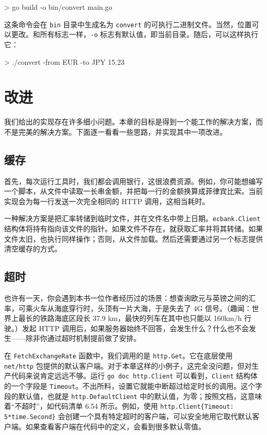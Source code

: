 \begin{shellcode}[]
> go build -o bin/convert main.go
\end{shellcode}

这条命令会在 \texttt{bin} 目录中生成名为 \texttt{convert} 的可执行二进制文件。当然，位置可以更改。和所有标志一样，\texttt{-o} 标志有默认值，即当前目录。随后，可以这样执行它：

\begin{shellcode}[]
> ./convert -from EUR -to JPY 15.23
\end{shellcode}

\section{改进}

我们给出的实现存在许多细小问题。本章的目标是得到一个能工作的解决方案，而不是完美的解决方案。下面逐一看看一些思路，并实现其中一项改进。

\subsection{缓存}

首先，每次运行工具时，我们都会调用银行，这很浪费资源。例如，你可能想编写一个脚本，从文件中读取一长串金额，并把每一行的金额换算成菲律宾比索。当前实现会为每一行发送一次完全相同的 HTTP 调用，这相当耗时。

一种解决方案是把汇率转储到临时文件，并在文件名中带上日期。\texttt{ecbank.Client} 结构体将持有指向该文件的指针。如果文件不存在，就获取汇率并将其转储。如果文件太旧，也执行同样操作；否则，从文件加载。然后还需要通过另一个标志提供清空缓存的方式。

\subsection{超时}

也许有一天，你会遇到本书一位作者经历过的场景：想查询欧元与英镑之间的汇率，可乘火车从海底穿行时，头顶有一片大海，于是失去了 4G 信号。（趣闻：世界上最长的铁路海底区段长 37.9 km，最快的列车在其中也只能以 160km/h 行驶。）发起 HTTP 调用后，如果服务器始终不回答，会发生什么？什么也不会发生——除非你通过超时机制提前做了安排。

在 \texttt{FetchExchangeRate} 函数中，我们调用的是 \texttt{http.Get}。它在底层使用 \texttt{net/http} 包提供的默认客户端。对于本章这样的小例子，这完全没问题，但对生产代码来说肯定远远不够。运行 \texttt{go doc http.Client} 可以看到，\texttt{Client} 结构体的一个字段是 \texttt{Timeout}。不出所料，设置它就能中断超过给定时长的调用。这个字段的默认值，也就是 \texttt{http.DefaultClient} 中的默认值，为零；按照文档，这意味着“不超时”，如代码清单 6.54 所示。例如，使用 \texttt{http.Client\{Timeout: 5*time.Second\}} 会创建一个具有特定超时的客户端，可以安全地用它取代默认客户端。如果查看客户端在代码中的定义，会看到很多默认零值。

